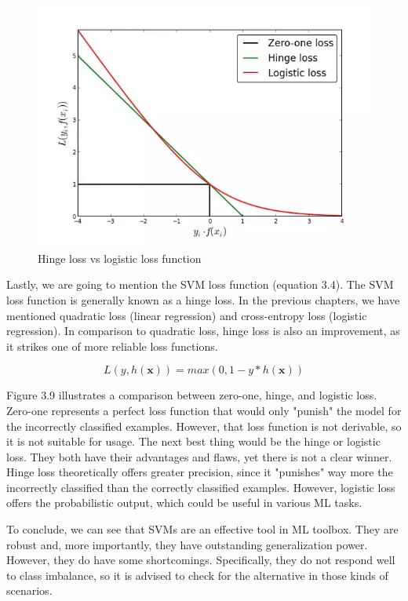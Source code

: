 \documentclass[times, utf8, seminar]{fer}
\begin{document}
\begin{figure}[h]
	\centering
	\includegraphics[width=12cm]{hinge-loss}
	\caption{Hinge loss vs logistic loss function \protect \footnotemark}
\end{figure}


Lastly, we are going to mention the SVM loss function (equation 3.4). The SVM loss function is generally known as a hinge loss. In the previous chapters, we have mentioned quadratic loss (linear regression) and cross-entropy loss (logistic regression).  In comparison to quadratic loss, hinge loss is also an improvement, as it strikes one of more reliable loss functions.

\begin{equation}
L(y,h(\textbf{x})) = max(0, 1 - y*h(\textbf{x}))
\end{equation}

Figure 3.9 illustrates a comparison between zero-one, hinge, and logistic loss.  Zero-one represents a perfect loss function that would only "punish" the model for the incorrectly classified examples. However, that loss function is not derivable, so it is not suitable for usage. The next best thing would be the hinge or logistic loss. They both have their advantages and flaws, yet there is not a clear winner. Hinge loss theoretically offers greater precision, since it "punishes" way more the incorrectly classified than the correctly classified examples. However, logistic loss offers the probabilistic output, which could be useful in various ML tasks. 

To conclude, we can see that SVMs are an effective tool in ML toolbox. They are robust and, more importantly, they have outstanding generalization power. However, they do have some shortcomings. Specifically, they do not respond well to class imbalance, so it is advised to check for the alternative in those kinds of scenarios.
\end{document}
